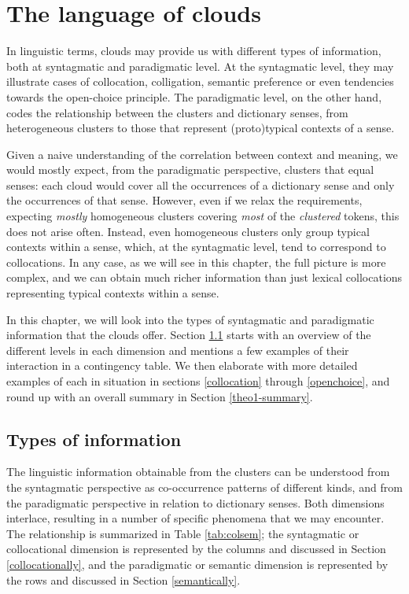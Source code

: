 \documentclass[
]{book}
\begin{document}
\hypertarget{semantic-interpretation}{%
\chapter{The language of clouds}\label{semantic-interpretation}}

In linguistic terms, clouds may provide us with different types of information, both at syntagmatic and paradigmatic level. At the syntagmatic level, they may illustrate cases of collocation, colligation, semantic preference or even tendencies towards the open-choice principle. The paradigmatic level, on the other hand, codes the relationship between the clusters and dictionary senses, from heterogeneous clusters to those that represent (proto)typical contexts of a sense.

Given a naive understanding of the correlation between context and meaning, we would mostly expect, from the paradigmatic perspective, clusters that equal senses: each cloud would cover all the occurrences of a dictionary sense and only the occurrences of that sense. However, even if we relax the requirements, expecting \emph{mostly} homogeneous clusters covering \emph{most} of the \emph{clustered} tokens, this does not arise often. Instead, even homogeneous clusters only group typical contexts within a sense, which, at the syntagmatic level, tend to correspond to collocations. In any case, as we will see in this chapter, the full picture is more complex, and we can obtain much richer information than just lexical collocations representing typical contexts within a sense.

In this chapter, we will look into the types of syntagmatic and paradigmatic information that the clouds offer. Section \ref{infotypes} starts with an overview of the different levels in each dimension and mentions a few examples of their interaction in a contingency table. We then elaborate with more detailed examples of each in situation in sections \ref{collocation} through \ref{openchoice}, and round up with an overall summary in Section \ref{theo1-summary}.

\hypertarget{infotypes}{%
\section{Types of information}\label{infotypes}}

The linguistic information obtainable from the clusters can be understood from the syntagmatic perspective as co-occurrence patterns of different kinds, and from the paradigmatic perspective in relation to dictionary senses. Both dimensions interlace, resulting in a number of specific phenomena that we may encounter. The relationship is summarized in Table \ref{tab:colsem}; the syntagmatic or collocational dimension is represented by the columns and discussed in Section \ref{collocationally}, and the paradigmatic or semantic dimension is represented by the rows and discussed in Section \ref{semantically}.
\end{document}
